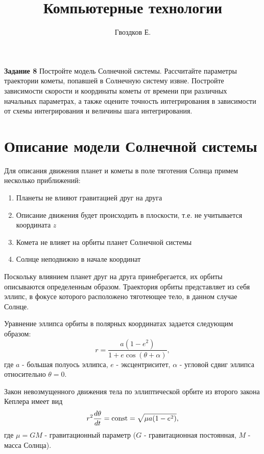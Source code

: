 



\title{Компьютерные технологии}
\author{Гвоздков Е.}




\maketitle

\textbf{Задание 8} Постройте модель Солнечной системы. Рассчитайте параметры траектории кометы,
попавшей в Солнечную систему извне. Постройте зависимости скорости и координаты кометы
от времени при различных начальных параметрах, а также оцените точность интегрирования в
зависимости от схемы интегрирования и величины шага интегрирования.

\section{Описание модели Солнечной системы}
Для описания движения планет и кометы в поле тяготения Солнца примем несколько приближений:
\begin{enumerate}
	\item Планеты не влияют гравитацией друг на друга
	\item Описание движения будет происходить в плоскости, т.е. не учитывается координата $z$
	\item Комета не влияет на орбиты планет Солнечной системы
	\item Солнце неподвижно в начале координат
\end{enumerate}
Поскольку влиянием планет друг на друга принебрегается, их орбиты описываются определенным образом.
Траектория орбиты представляет из себя эллипс, в фокусе которого расположено тяготеющее тело, в данном случае Солнце.

Уравнение эллипса орбиты в полярных координатах задается следующим образом:
\begin{equation}
	r = \frac{a(1-e^2)}{1 + e \cos(\theta + \alpha)},
\end{equation}
где $a$ - большая полуось эллипса, $e$ - эксцентриситет, $\alpha$ - угловой сдвиг
эллипса относительно $\theta=0$.

Закон невозмущенного движения тела по эллиптической орбите из второго закона Кеплера имеет вид
\begin{equation}
	r^2\frac{d\theta}{d t} = \text{\rmfamily\upshape const} = \sqrt{\mu a (1-e^2)},
\end{equation}
где $\mu = GM$ - гравитационный параметр ($G$ - гравитационная постоянная, $M$ - масса Солнца).

